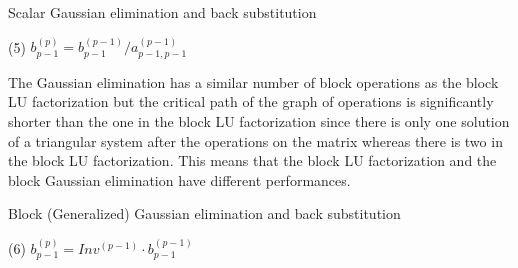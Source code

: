 \begin{algorithm}[h]
	\DontPrintSemicolon
	\caption{Scalar Gaussian elimination and back substitution \label{alg:bg_el_scalar}}

	(5) $b_{p-1}^{(p)} = b_{p-1}^{(p-1)} / a_{p-1,p-1}^{(p-1)} $ \;

\end{algorithm}

The Gaussian elimination has a similar number of block operations as the block LU factorization but the critical path of the graph of operations is significantly shorter than the one in the block LU factorization since there is only one solution of a triangular system after the operations on the matrix whereas there is two in the block LU factorization.
This means that the block LU factorization and the block Gaussian elimination have different performances.

\begin{algorithm}[h]
	\DontPrintSemicolon
	\caption{Block (Generalized) Gaussian elimination and back substitution \label{alg:bg_el_block}}

	(6) $b_{p-1}^{(p)} = Inv^{(p-1)} \cdot b_{p-1}^{(p-1)}$ \;

\end{algorithm}



